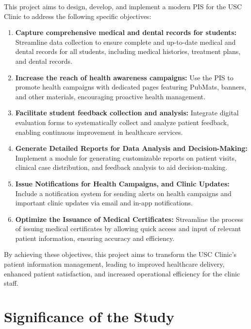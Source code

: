 This project aims to design, develop, and implement a modern PIS for the USC Clinic to address the following specific objectives:
\begin{enumerate}
    \item \textbf{Capture comprehensive medical and dental records for students:} Streamline data collection to ensure complete and up-to-date medical and dental records for all students, including medical histories, treatment plans, and dental records.
    \item \textbf{Increase the reach of health awareness campaigns:} Use the PIS to promote health campaigns with dedicated pages featuring PubMats, banners, and other materials, encouraging proactive health management.
    \item \textbf{Facilitate student feedback collection and analysis:} Integrate digital evaluation forms to systematically collect and analyze patient feedback, enabling continuous improvement in healthcare services.
    \item \textbf{Generate Detailed Reports for Data Analysis and Decision-Making:} Implement a module for generating customizable reports on patient visits, clinical case distribution, and feedback analysis to aid decision-making.
    \item \textbf{Issue Notifications for Health Campaigns, and Clinic Updates:} Include a notification system for sending alerts on health campaigns and important clinic updates via email and in-app notifications.
    \item \textbf{Optimize the Issuance of Medical Certificates:} Streamline the process of issuing medical certificates by allowing quick access and input of relevant patient information, ensuring accuracy and efficiency.
\end{enumerate}

By achieving these objectives, this project aims to transform the USC Clinic's patient information management, leading to improved healthcare delivery, enhanced patient satisfaction, and increased operational efficiency for the clinic staff.

\section{Significance of the Study}

